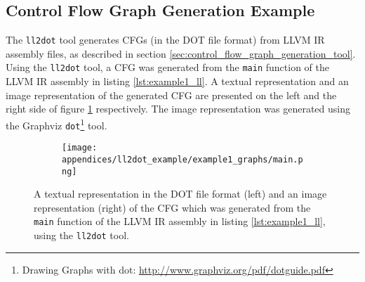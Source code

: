
\subsection{Control Flow Graph Generation Example}
\label{app:control_flow_graph_generation_example}


The \texttt{ll2dot} tool generates CFGs (in the DOT file format) from LLVM IR assembly files, as described in section \ref{sec:control_flow_graph_generation_tool}. Using the \texttt{ll2dot} tool, a CFG was generated from the \texttt{main} function of the LLVM IR assembly in listing \ref{lst:example1_ll}. A textual representation and an image representation of the generated CFG are presented on the left and the right side of figure \ref{fig:example1_cfg} respectively. The image representation was generated using the Graphviz \texttt{dot}\footnote{Drawing Graphs with dot: \url{http://www.graphviz.org/pdf/dotguide.pdf}} tool.


\begin{figure}[htbp]
	\centering
	\begin{subfigure}[ht]{0.38\textwidth}
		
	\end{subfigure}
	\qquad
	\begin{subfigure}[ht]{0.20\textwidth}
		\texttt{[image: appendices/ll2dot\_example/example1\_graphs/main.png]}
	\end{subfigure}
	\caption{A textual representation in the DOT file format (left) and an image representation (right) of the CFG which was generated from the \texttt{main} function of the LLVM IR assembly in listing \ref{lst:example1_ll}, using the \texttt{ll2dot} tool.}
	\label{fig:example1_cfg}
\end{figure}

